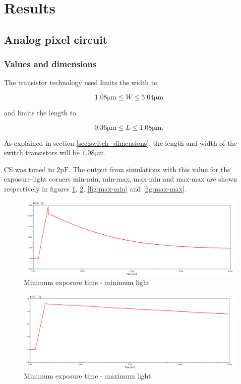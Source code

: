 \section{Results}
\subsection{Analog pixel circuit}
\subsubsection{Values and dimensions}
The transistor technology used limits the width to 

\begin{equation}
    \label{eq:limitsW}
    1.08 \mathrm{\mu m} \leq W \leq 5.04 \mathrm{\mu m}
\end{equation}

and limits the length to

\begin{equation}
    \label{eq:limitsL}
    0.36 \mathrm{\mu m} \leq L \leq 1.08 \mathrm{\mu m}.
\end{equation}

As explained in section \ref{sec:switch_dimensions}, the length and width of the switch transistors will be $1.08\mathrm{\mu m}$.

CS was tuned to $2 \mathrm{pF}$. The output from simulations with this value for the exposure-light corners min-min, min-max, max-min and max-max are shown respectively in figures \ref{fig:min-min}, \ref{fig:min-max}, \ref{fig:max-min} and \ref{fig:max-max}.

\begin{figure}
    \centering
    \includegraphics[width=\textwidth]{graphs/minExp_minLight.png}
    \caption{Minimum exposure time - minimum light}
    \label{fig:min-min}
\end{figure}

\begin{figure}
    \centering
    \includegraphics[width=\textwidth]{graphs/minExp_maxLight.png}
    \caption{Minimum exposure time - maximum light}
    \label{fig:min-max}
\end{figure}

